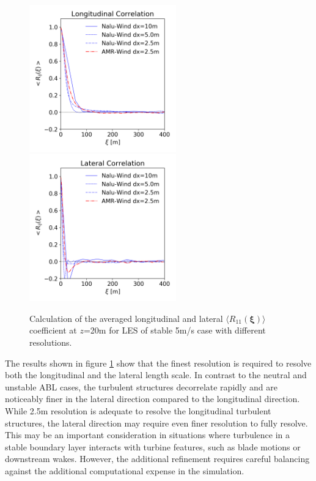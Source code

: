 \begin{figure}%
  \centering
  \\
  \includegraphics[width=2.5in]{figures/GridStudy_Rij_Longitudinal.png}
  \includegraphics[width=2.5in]{figures/GridStudy_Rij_Lateral.png}
  \caption{\label{fig:GridStudyRij} Calculation of the averaged
    longitudinal and lateral $\langle R_{11}(\boldsymbol{\xi})
    \rangle$ coefficient at $z$=20m for LES of stable 5m/s case with
    different resolutions.}
\end{figure}

The results shown in figure \ref{fig:GridStudyRij} show that the
finest resolution is required to resolve both the longitudinal and the
lateral length scale.  In contrast to the neutral and unstable ABL
cases, the turbulent structures decorrelate rapidly and are noticeably
finer in the lateral direction compared to the longitudinal direction.
While 2.5m resolution is adequate to resolve the longitudinal
turbulent structures, the lateral direction may require even finer
resolution to fully resolve.  This may be an important consideration
in situations where turbulence in a stable boundary layer interacts
with turbine features, such as blade motions or downstream wakes.
However, the additional refinement requires careful balancing against
the additional computational expense in the simulation.

